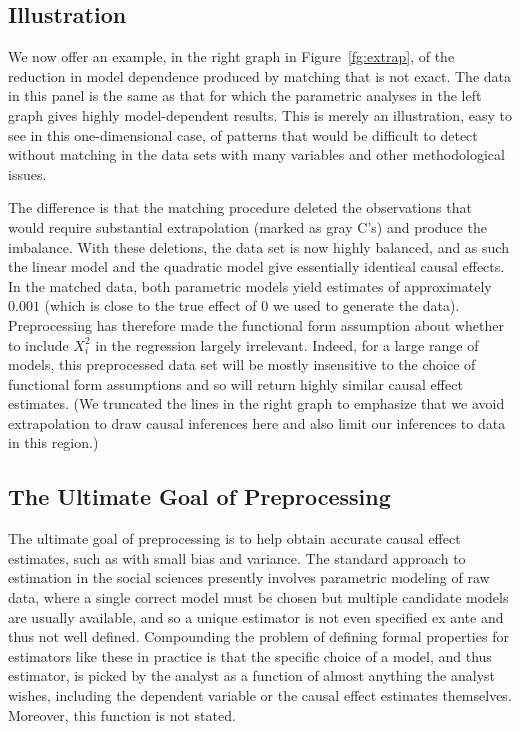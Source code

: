 \documentclass[11pt,titlepage]{article}
\begin{document}
\subsection{Illustration}
We now offer an example, in the right graph in Figure~\ref{fg:extrap},
of the reduction in model dependence produced by matching that is not
exact.  The data in this panel is the same as that for which the
parametric analyses in the left graph gives highly model-dependent
results.  This is merely an illustration, easy to see in this
one-dimensional case, of patterns that would be difficult to detect
without matching in the data sets with many variables and other
methodological issues.

The difference is that the matching procedure deleted the observations
that would require substantial extrapolation (marked as gray C's) and
produce the imbalance.  With these deletions, the data set is now
highly balanced, and as such the linear model and the quadratic model
give essentially identical causal effects.  In the matched data, both
parametric models yield estimates of approximately $0.001$ (which is
close to the true effect of $0$ we used to generate the data).
Preprocessing has therefore made the functional form assumption about
whether to include $X_i^2$ in the regression largely irrelevant.
Indeed, for a large range of models, this preprocessed data set will
be mostly insensitive to the choice of functional form assumptions and
so will return highly similar causal effect estimates.  (We truncated
the lines in the right graph to emphasize that we avoid extrapolation
to draw causal inferences here and also limit our inferences to data
in this region.)

\subsection{The Ultimate Goal of Preprocessing} \label{s:ultim}
The ultimate goal of preprocessing is to help obtain accurate causal
effect estimates, such as with small bias and variance.  The standard
approach to estimation in the social sciences presently involves
parametric modeling of raw data, where a single correct model must be
chosen but multiple candidate models are usually available, and so a
unique estimator is not even specified ex ante and thus not well
defined.  Compounding the problem of defining formal properties for
estimators like these in practice is that the specific choice of a
model, and thus estimator, is picked by the analyst as a function of
almost anything the analyst wishes, including the dependent variable
or the causal effect estimates themselves.  Moreover, this function is
not stated.
\end{document}
